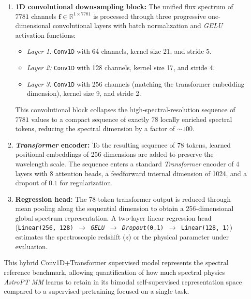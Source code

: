 \begin{enumerate}
\item \textbf{1D convolutional downsampling block:} The unified flux spectrum of $7781$ channels $\mathbf{f} \in \mathbb{R}^{1 \times 7781}$ is processed through three progressive one-dimensional convolutional layers with batch normalization and \textit{\gls{GELU}} activation functions:

    \begin{itemize}
    \item \textit{Layer 1:} \texttt{Conv1D} with 64 channels, kernel size 21, and stride 5.
    \item \textit{Layer 2:} \texttt{Conv1D} with 128 channels, kernel size 17, and stride 4.
    \item \textit{Layer 3:} \texttt{Conv1D} with 256 channels (matching the transformer embedding dimension), kernel size 9, and stride 2.
    \end{itemize}
    
    This convolutional block collapses the high-spectral-resolution sequence of $7781$ values to a compact sequence of exactly $78$ locally enriched spectral tokens, reducing the spectral dimension by a factor of $\sim 100$.
    
\item \textbf{\textit{Transformer} encoder:} To the resulting sequence of 78 tokens, learned positional embeddings of 256 dimensions are added to preserve the wavelength scale. The sequence enters a standard \textit{Transformer} encoder of 4 layers with 8 attention heads, a feedforward internal dimension of 1024, and a dropout of $0.1$ for regularization.

\item \textbf{Regression head:} The 78-token transformer output is reduced through mean pooling along the sequential dimension to obtain a 256-dimensional global spectrum representation. A two-layer linear regression head (\texttt{Linear(256, 128) $\rightarrow$ \textit{\gls{GELU}} $\rightarrow$ \textit{Dropout}(0.1) $\rightarrow$ Linear(128, 1)}) estimates the spectroscopic redshift ($z$) or the physical parameter under evaluation.
\end{enumerate}

This hybrid Conv1D+Transformer supervised model represents the spectral reference benchmark, allowing quantification of how much spectral physics \textit{AstroPT MM} learns to retain in its bimodal self-supervised representation space compared to a supervised pretraining focused on a single task.



